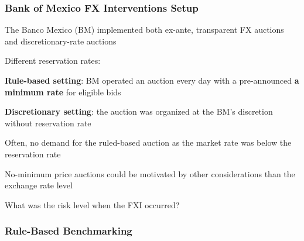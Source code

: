 \documentclass{beamer}
\newenvironment{wideitemize}{\itemize\addtolength{\itemsep}{10pt}}{\enditemize}
\begin{document}
\begin{frame}
  \frametitle{Bank of Mexico FX Interventions Setup}  
  \begin{wideitemize}
    \item The Banco Mexico (BM) implemented both ex-ante, transparent FX
      auctions and discretionary-rate auctions
    \item Different reservation rates:
      \begin{wideitemize}
      \item \textbf{Rule-based setting}: BM operated an auction every day
        with a pre-announced \textbf{a minimum rate} for eligible bids
      \item \textbf{Discretionary setting}: the auction was organized at the BM's discretion without reservation rate
      \end{wideitemize}
  \item Often, no demand for the ruled-based auction as the market rate was
    below the reservation rate
  \item No-minimum price auctions could be motivated by other considerations
    than the exchange rate level
  \item What was the risk level when the FXI occurred?
  \end{wideitemize}
\end{frame}


\begin{frame}
  \frametitle{Rule-Based Benchmarking}
\end{frame}
\end{document}
